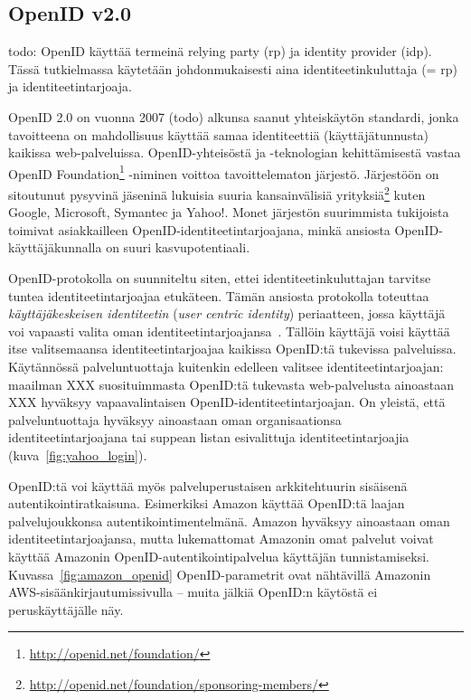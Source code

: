 \documentclass[finnish,gradu]{tktltiki}
\begin{document}



  \subsection{OpenID v2.0} %
  \label{sub:openid}

  todo: OpenID käyttää termeinä relying party (rp) ja identity provider (idp). Tässä tutkielmassa käytetään johdonmukaisesti aina identiteetinkuluttaja (= rp) ja identiteetintarjoaja.

  OpenID 2.0 on vuonna 2007 (todo) alkunsa saanut yhteiskäytön standardi, jonka tavoitteena on mahdollisuus käyttää samaa identiteettiä (käyttäjätunnusta) kaikissa web-palveluissa. OpenID-yhteisöstä ja -teknologian kehittämisestä vastaa OpenID Foundation\footnote{\url{http://openid.net/foundation/}} -niminen voittoa tavoittelematon järjestö. Järjestöön on sitoutunut pysyvinä jäseninä lukuisia suuria kansainvälisiä yrityksiä\footnote{\url{http://openid.net/foundation/sponsoring-members/}} kuten Google, Microsoft, Symantec ja Yahoo!. Monet järjestön suurimmista tukijoista toimivat asiakkailleen OpenID-identiteetintarjoajana, minkä ansiosta OpenID-käyttäjäkunnalla on suuri kasvupotentiaali.

  OpenID-protokolla on suunniteltu siten, ettei identiteetinkuluttajan tarvitse tuntea identiteetintarjoajaa etukäteen. Tämän ansiosta protokolla toteuttaa \emph{käyttäjäkeskeisen identiteetin} (\emph{user centric identity}) periaatteen, jossa käyttäjä voi vapaasti valita oman identiteetintarjoajansa~\cite{openid_recordon_2009}. Tällöin käyttäjä voisi käyttää itse valitsemaansa identiteetintarjoajaa kaikissa OpenID:tä tukevissa palveluissa. Käytännössä palveluntuottaja kuitenkin edelleen valitsee identiteetintarjoajan: maailman XXX suosituimmasta OpenID:tä tukevasta web-palvelusta ainoastaan XXX hyväksyy vapaavalintaisen OpenID-identiteetintarjoajan. On yleistä, että palveluntuottaja hyväksyy ainoastaan oman organisaationsa identiteetintarjoajana tai suppean listan esivalittuja identiteetintarjoajia (kuva~\ref{fig:yahoo_login}).

  OpenID:tä voi käyttää myös palveluperustaisen arkkitehtuurin sisäisenä autentikointiratkaisuna. Esimerkiksi Amazon käyttää OpenID:tä laajan palvelujoukkonsa autentikointimentelmänä. Amazon hyväksyy ainoastaan oman identiteetintarjoajansa, mutta lukemattomat Amazonin omat palvelut voivat käyttää Amazonin OpenID-autentikointipalvelua käyttäjän tunnistamiseksi. Kuvassa~\ref{fig:amazon_openid} OpenID-parametrit ovat nähtävillä Amazonin AWS-sisäänkirjautumissivulla -- muita jälkiä OpenID:n käytöstä ei peruskäyttäjälle näy.
\end{document}
